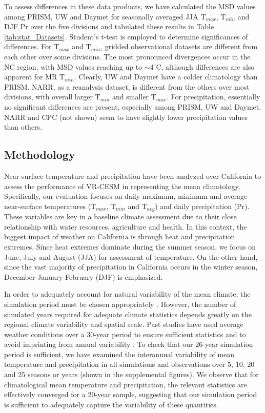 \documentclass[draft,ms]{agutex}   %
\begin{document}
\begin{article}
To assess differences in these data products, we have calculated the MSD values among PRISM, UW and Daymet for seasonally averaged JJA T$_{max}$, T$_{min}$ and DJF Pr over the five divisions and tabulated these results in Table \ref{tab:stat_Datasets}. Student's t-test is employed to determine significances of differences. For T$_{max}$ and T$_{min}$, gridded observational datasets are different from each other over some divisions.  The most pronounced divergences occur in the NC region, with MSD values reaching up to $\sim$4$^\circ$C, although differences are also apparent for MR T$_{min}$. Clearly, UW and Daymet have a colder climatology than PRISM. NARR, as a reanalysis dataset, is different from the others over most divisions, with overall larger T$_{min}$ and smaller T$_{max}$. For precipitation, essentially no significant differences are present, especially among PRISM, UW and Daymet. NARR and CPC (not shown) seem to have slightly lower precipitation values than others.

\subsection{Methodology}

Near-surface temperature and precipitation have been analyzed over California to assess the performance of VR-CESM in representing the mean climatology. Specifically, our evaluation focuses on daily maximum, minimum and average near-surface temperatures (T$_{max}$, T$_{min}$ and T$_{avg}$) and daily precipitation (Pr). These variables are key in a baseline climate assessment due to their close relationship with water resources, agriculture and health. In this context, the biggest impact of weather on California is through heat and precipitation extremes. Since heat extremes dominate during the summer season, we focus on June, July and August (JJA) for assessment of temperature. On the other hand, since the vast majority of precipitation in California occurs in the winter season, December-January-February (DJF) is emphasized.  

In order to adequately account for natural variability of the mean climate, the simulation period must be chosen appropriately \citep{solomon2007climate}. However, the number of simulated years required for adequate climate statistics depends greatly on the regional climate variability and spatial scale. Past studies have used average weather conditions over a 30-year period to ensure sufficient statistics and to avoid imprinting from annual variability \citep{dinse2009climate}. To check that our 26-year simulation period is sufficient, we have examined the interannual variability of mean temperature and precipitation in all simulations and observations over 5, 10, 20 and 25 seasons or years (shown in the supplemental figures). We observe that for climatological mean temperature and precipitation, the relevant statistics are effectively converged for a 20-year sample, suggesting that our simulation period is sufficient to adequately capture the variability of these quantities. 



\end{article}
\end{document}
